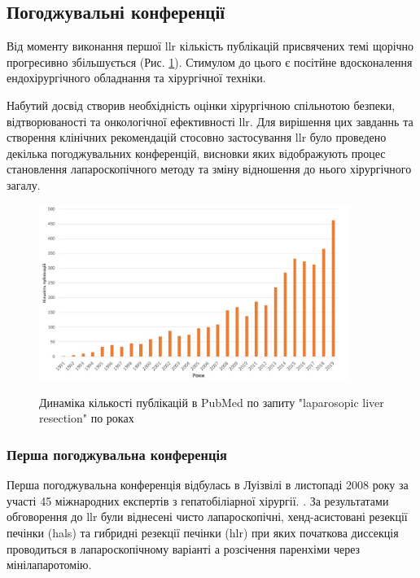 \begin{refsection}
\subsection{Погоджувальні конференції}

Від моменту виконання першої \acrshort{llr} кількість публікацій присвячених темі щорічно прогресивно збільшується (Рис. \ref{fig:PubMed_publications}). Стимулом до цього є посітйне вдосконалення ендохірургічного обладнання та хірургічної техніки.

Набутий досвід створив необхідність оцінки хірургічною спільнотою безпеки, відтворюваності та онкологічної ефективності \acrshort{llr}. Для вирішення цих завданнь та створення клінічних рекомендацій стосовно застосування \acrshort{llr} було  проведено декілька погоджувальних конференцій, висновки яких відображують процес становлення лапароскопічного методу та зміну відношення до нього хірургічного загалу. 

\begin{figure}[h]
\caption{Динаміка кількості публікацій в PubMed по запиту "laparosopic liver resection" по роках \cite{Hashizume1995}}
\centering
\includegraphics[width=0.9\textwidth]{Illustrations/Chapter_01/PubMed_publications.jpg}
\label{fig:PubMed_publications}
\end{figure}

\subsubsection{Перша погоджувальна конференція} 

Перша погоджувальна конференція відбулась в Луізвілі в листопаді 2008 року за участі 45 міжнародних експертів з гепатобіліарної хірургії. \cite{Buell2009}. За результатами обговорення до  \acrshort{llr} були віднесені чисто лапароскопічні, хенд-асистовані резекції печінки (\acrshort{hals}) та гибридні резекції печінки (\acrshort{hlr}) при яких початкова диссекція проводиться в лапароскопічному варіанті а розсічення паренхіми через мінілапаротомію. 


\end{refsection}
